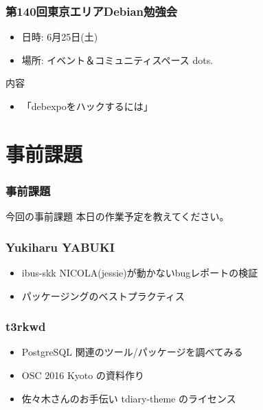 \documentclass[cjk,dvipdfmx,10pt,compress,%
hyperref={bookmarks=true,bookmarksnumbered=true,bookmarksopen=false,%
colorlinks=false,%
pdftitle={第 111 回 関西 Debian 勉強会},%
pdfauthor={倉敷・のがた・佐々木・かわだ},%
pdfsubject={資料},%
}]{beamer}
\begin{document}
\begin{frame}[fragile]
  \frametitle{第140回東京エリアDebian勉強会}
  \begin{itemize}
  \item 日時: 6月25日(土)
  \item 場所: イベント＆コミュニティスペース dots.
  \end{itemize}
  \begin{block}{内容}
    \begin{itemize}
    \item 「debexpoをハックするには」
    \end{itemize}
  \end{block}
\end{frame}


\section{事前課題}

\begin{frame}[fragile]
  \frametitle{事前課題}
  \begin{block}{今回の事前課題}
    本日の作業予定を教えてください。
  \end{block}
\end{frame}


\begin{frame}
  \frametitle{ Yukiharu YABUKI }
  \begin{itemize}
  \item ibus-skk NICOLA(jessie)が動かないbugレポートの検証
  \item パッケージングのベストプラクティス
  \end{itemize}
\end{frame}

\begin{frame}
  \frametitle{ t3rkwd }
  \begin{itemize}
  \item PostgreSQL 関連のツール/パッケージを調べてみる
  \item OSC 2016 Kyoto の資料作り
  \item 佐々木さんのお手伝い tdiary-theme のライセンス
  \end{itemize}
\end{frame}
\end{document}
